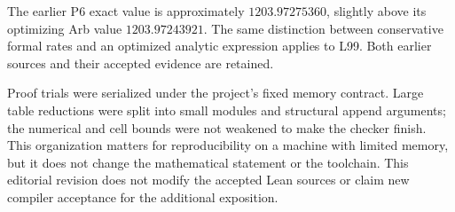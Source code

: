 The earlier P6 exact value is approximately
\(1203.97275360\), slightly above its optimizing Arb value
\(1203.97243921\). The same distinction between conservative formal
rates and an optimized analytic expression applies to L99. Both
earlier sources and their accepted evidence are retained.

Proof trials were serialized under the project's fixed memory
contract. Large table reductions were split into small modules
and structural append arguments; the numerical and cell bounds
were not weakened to make the checker finish. This organization
matters for reproducibility on a machine with limited memory, but
it does not change the mathematical statement or the toolchain.
This editorial revision does not modify the accepted Lean sources
or claim new compiler acceptance for the additional exposition.
